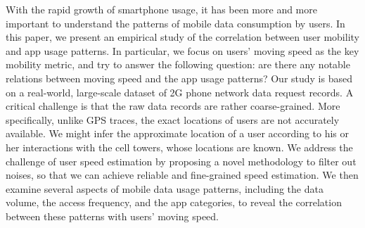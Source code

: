 With the rapid growth of smartphone usage, it has been more and more important to understand the patterns of mobile data consumption by users.
In this paper, we present an empirical study 
of the correlation between user mobility and app usage patterns.
In particular, we focus on users' moving speed as the key mobility metric,
and try to answer the following question:
are there any notable relations between moving speed and the app usage patterns?
Our study is based on a real-world, large-scale dataset of 2G phone network data request records.
A critical challenge is that the raw data records are rather coarse-grained.
More specifically, unlike GPS traces, the exact locations of users are not accurately available.
We might infer the approximate location of a user according to his or her interactions with the cell towers, whose locations are known.
We address the challenge of user speed estimation by proposing a novel methodology to filter out noises,
so that we can achieve reliable and fine-grained speed estimation.
We then examine several aspects of mobile data usage patterns,
including the data volume, the access frequency, and the app categories,
to reveal the correlation between these patterns with users' moving speed.